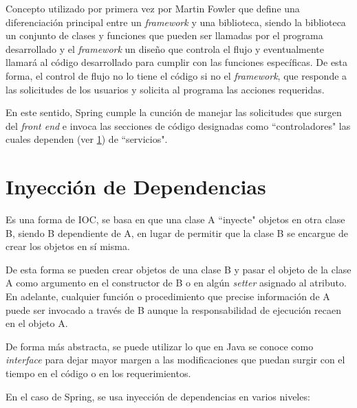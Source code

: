     Concepto utilizado por primera vez por Martin Fowler\cite{IOC-dgarcia} que define una diferenciación principal entre un \textit{framework} y una biblioteca, siendo la biblioteca un conjunto de clases y funciones que pueden ser llamadas por el programa desarrollado y el \textit{framework} un diseño que controla el flujo y eventualmente llamará al código desarrollado para cumplir con las funciones específicas. De esta forma, el control de flujo no lo tiene el código si no el \textit{framework}, que responde a las solicitudes de los usuarios y solicita al programa las acciones requeridas.
    
    En este sentido, Spring cumple la cunción de manejar las solicitudes que surgen del \textit{front end} e invoca las secciones de código designadas como ``controladores" las cuales dependen (ver \ref{teorico-di}) de ``servicios".
    
    \section{Inyección de Dependencias}
    \label{teorico-di}
    
    Es una forma de IOC, se basa en que una clase A ``inyecte" objetos en otra clase B, siendo B dependiente de A, en lugar de permitir que la clase B se encargue de crear los objetos en sí misma\cites{IOC-mpachano}{IOC-dgarcia}.
    
    De esta forma se pueden crear objetos de una clase B y pasar el objeto de la clase A como argumento en el constructor de B o en algún \textit{setter} asignado al atributo. En adelante, cualquier función o procedimiento que precise información de A puede ser invocado a través de B aunque la responsabilidad de ejecución recaen en el objeto A.
    
    De forma más abstracta, se puede utilizar lo que en Java se conoce como \textit{interface} para dejar mayor margen a las modificaciones que puedan surgir con el tiempo en el código o en los requerimientos.
    
    En el caso de Spring, se usa inyección de dependencias en varios niveles:
    
